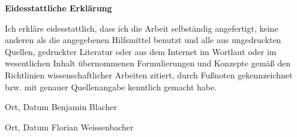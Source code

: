 \textbf{\Large Eidesstattliche Erklärung}

Ich erkläre eidesstattlich, dass ich die Arbeit selbständig angefertigt, keine anderen als die angegebenen Hilfsmittel benutzt und alle aus ungedruckten Quellen, gedruckter Literatur oder aus dem Internet im Wortlaut oder im wesentlichen Inhalt übernommenen Formulierungen und Konzepte gemäß den Richtlinien wissenschaftlicher Arbeiten zitiert, durch Fußnoten gekennzeichnet bzw. mit genauer Quellenangabe kenntlich gemacht habe.

\vspace{1.5cm}
\hspace{1.5cm}{\Large Kapfenberg, \today}

\hspace{1.5cm}\hrulefill{}\hspace{2.35cm}\hrulefill{}\hspace{1cm}

\hspace{1.5cm} Ort, Datum \hspace{5.35cm} Benjamin Blacher \hfill

\vspace{1.5cm}
\hspace{1.5cm}{\Large Kapfenberg, \today}

\hspace{1.5cm}\hrulefill{}\hspace{2.35cm}\hrulefill{}\hspace{1cm}

\hspace{1.5cm} Ort, Datum \hspace{5.35cm} Florian Weissenbacher \hfill